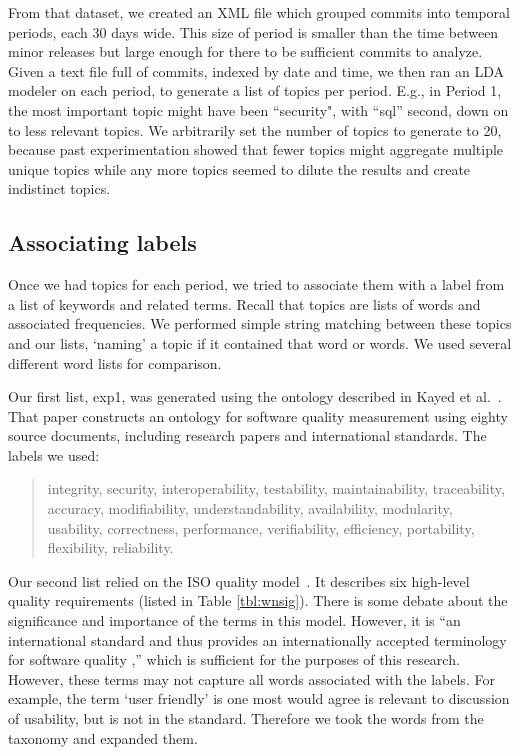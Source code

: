 \documentclass[10pt, conference, compsocconf]{IEEEtran}
\begin{document}
From that dataset, we created an XML file which grouped commits into temporal periods, each 30 days wide. This size of period is smaller than the time between minor releases but large enough for there to be sufficient commits to analyze. Given a text file full of commits, indexed by date and time, we then ran an LDA modeler on each period, to generate a list of topics per period. E.g., in Period 1, the most important topic might have been ``security", with ``sql'' second, down on to less relevant topics. We arbitrarily set the number of topics to generate to 20, because past experimentation showed that fewer topics might aggregate multiple unique topics while any more topics seemed to dilute the results and create indistinct topics.

\subsection{Associating labels}
Once we had topics for each period, we tried to associate them with a label from a list of keywords and related terms. Recall that topics are lists of words and associated frequencies. We performed simple string matching between these topics and our lists, `naming' a topic if it contained that word or words. We used several different word lists for comparison. 

Our first list, \textsf{exp1}, was generated using the ontology described in Kayed et al.~\cite{5072519}. That paper constructs an ontology for software quality measurement using eighty source documents, including research papers and international standards. The labels we used:
\begin{quotation}
\small \noindent \textsf{
integrity, security,
interoperability, testability, maintainability, traceability,
accuracy, modifiability, understandability, availability, modularity,
usability, correctness, performance, verifiability, efficiency,
portability, flexibility, reliability.}
\end{quotation}

Our second list relied on the ISO quality model~\cite{iso9126}. It describes six high-level quality requirements (listed in Table \ref{tbl:wnsig}). There is some debate about the significance and importance of the terms in this model. However, it is ``an international standard and thus provides an internationally accepted terminology for software quality \cite[p. 58]{Bøegh2008},'' which is sufficient for the purposes of this research. However, these terms may not capture all words associated with the labels.  For example, the term ‘user friendly’ is one most would agree is relevant to discussion of usability, but is not in the standard. Therefore we took the words from the taxonomy and expanded them.
\end{document}
